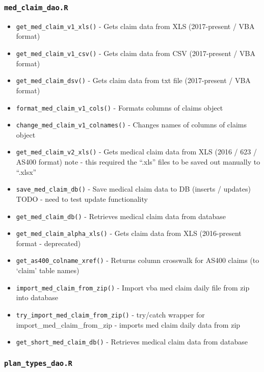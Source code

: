 \documentclass[
]{book}
\providecommand{\tightlist}{%
  \setlength{\itemsep}{0pt}\setlength{\parskip}{0pt}}
\begin{document}
\hypertarget{med_claim_dao.r}{%
\subsubsection{\texorpdfstring{\texttt{med\_claim\_dao.R}}{med\_claim\_dao.R}}\label{med_claim_dao.r}}

\begin{itemize}
\tightlist
\item
  \texttt{get\_med\_claim\_v1\_xls()} - Gets claim data from XLS (2017-present / VBA format)
\item
  \texttt{get\_med\_claim\_v1\_csv()} - Gets claim data from CSV (2017-present / VBA format)
\item
  \texttt{get\_med\_claim\_dsv()} - Gets claim data from txt file (2017-present / VBA format)
\item
  \texttt{format\_med\_claim\_v1\_cols()} - Formats columns of claims object
\item
  \texttt{change\_med\_claim\_v1\_colnames()} - Changes names of columns of claims object
\item
  \texttt{get\_med\_claim\_v2\_xls()} - Gets medical claim data from XLS (2016 / 623 / AS400 format) note - this required the ``.xls'' files to be saved out manually to ``.xlsx''
\item
  \texttt{save\_med\_claim\_db()} - Save medical claim data to DB (inserts / updates) TODO - need to test update functionality
\item
  \texttt{get\_med\_claim\_db()} - Retrieves medical claim data from database
\item
  \texttt{get\_med\_claim\_alpha\_xls()} - Gets claim data from XLS (2016-present format - deprecated)
\item
  \texttt{get\_as400\_colname\_xref()} - Returns column crosswalk for AS400 claims (to `claim' table names)
\item
  \texttt{import\_med\_claim\_from\_zip()} - Import vba med claim daily file from zip into database
\item
  \texttt{try\_import\_med\_claim\_from\_zip()} - try/catch wrapper for import\_med\_claim\_from\_zip - imports med claim daily data from zip
\item
  \texttt{get\_short\_med\_claim\_db()} - Retrieves medical claim data from database
\end{itemize}

\hypertarget{plan_types_dao.r}{%
\subsubsection{\texorpdfstring{\texttt{plan\_types\_dao.R}}{plan\_types\_dao.R}}\label{plan_types_dao.r}}
\end{document}
